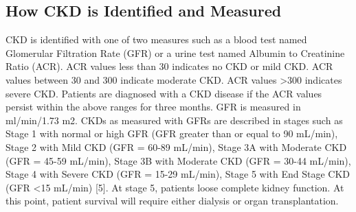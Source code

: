 \subsection{How CKD is Identified and Measured}
CKD is identified with one of two measures such as a blood test named Glomerular Filtration Rate (GFR) or a urine test named Albumin to Creatinine Ratio (ACR).  ACR values less than 30 indicates no CKD or mild CKD. ACR values between 30 and 300 indicate moderate CKD. ACR values \textgreater 300 indicates severe CKD. Patients are diagnosed with a CKD disease if the ACR values persist within the above ranges for three months. GFR is measured in ml/min/1.73 m2. CKDs as measured with GFRs are described in stages such as Stage 1 with normal or high GFR (GFR greater than or equal to  90 mL/min), Stage 2 with Mild CKD (GFR = 60-89 mL/min), Stage 3A with Moderate CKD (GFR = 45-59 mL/min), Stage 3B with Moderate CKD (GFR = 30-44 mL/min), Stage 4 with Severe CKD (GFR = 15-29 mL/min), Stage 5 with End Stage CKD (GFR \textless 15 mL/min) [5]. At stage 5, patients loose complete kidney function. At this point, patient survival will require either dialysis or organ transplantation.